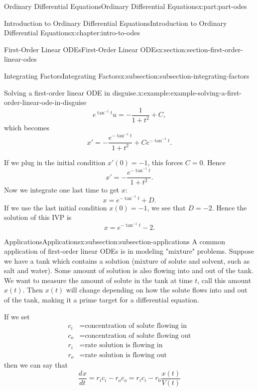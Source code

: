 \documentclass[twoside,10pt,]{book}
\numberwithin{equation}{part}
\providecommand{\dv}[3][]{\dfrac{d^{#1} #2}{d #3^{#1}}}
\begin{document}
\begin{partptx}{Ordinary Differential Equations}{}{Ordinary Differential Equations}{}{}{x:part:part-odes}
\begin{chapterptx}{Introduction to Ordinary Differential Equations}{}{Introduction to Ordinary Differential Equations}{}{}{x:chapter:intro-to-odes}
\begin{sectionptx}{First-Order Linear ODEs}{}{First-Order Linear ODEs}{}{}{x:section:section-first-order-linear-odes}
\begin{subsectionptx}{Integrating Factors}{}{Integrating Factors}{}{}{x:subsection:subsection-integrating-factors}
\begin{example}{Solving a first-order linear ODE in disguise.}{x:example:example-solving-a-first-order-linear-ode-in-disguise}
\begin{equation*}
e^{\tan^{-1}t}u = -\frac{1}{1+t^{2}}+C,
\end{equation*}
which becomes%
\begin{equation*}
x' = -\frac{e^{-\tan^{-1}t}}{1+t^{2}}+Ce^{-\tan^{-1}t}.
\end{equation*}
%
\par
If we plug in the initial condition \(x'(0) = -1\), this forces \(C=0\). Hence%
\begin{equation*}
x' = -\frac{e^{-\tan^{-1}t}}{1+t^{2}}.
\end{equation*}
Now we integrate one last time to get \(x\):%
\begin{equation*}
x = e^{-\tan^{-1}t}+D.
\end{equation*}
If we use the last initial condition \(x(0)=-1\), we see that \(D = -2\). Hence the solution of this IVP is%
\begin{equation*}
x = e^{-\tan^{-1}t}-2.
\end{equation*}
%
\end{example}
\end{subsectionptx}
%
%
\typeout{************************************************}
\typeout{************************************************}
%
\begin{subsectionptx}{Applications}{}{Applications}{}{}{x:subsection:subsection-applications}
A common application of first-order linear ODEs is in modeling "mixture" problems. Suppose we have a tank which contains a solution (mixture of solute and solvent, such as salt and water). Some amount of solution is also flowing into and out of the tank. We want to measure the amount of solute in the tank at time \(t\), call this amount \(x(t)\). Then \(x(t)\) will change depending on how the solute flows into and out of the tank, making it a prime target for a differential equation.%
\par
If we set%
\begin{align*}
c_{i} & =\text{concentration of solute flowing in} \\
c_{o} & =\text{concentration of solute flowing out} \\
r_{i} & =\text{rate solution is flowing in} \\
r_{o} & = \text{rate solution is flowing out} 
\end{align*}
then we can say that%
\begin{equation*}
\dv{x}{t} = r_{i}c_{i} - r_{o}c_{o} = r_{i}c_{i} - r_{0}\frac{x(t)}{V(t)}
\end{equation*}

\end{subsectionptx}
\end{sectionptx}
\end{chapterptx}
\end{partptx}
\end{document}
